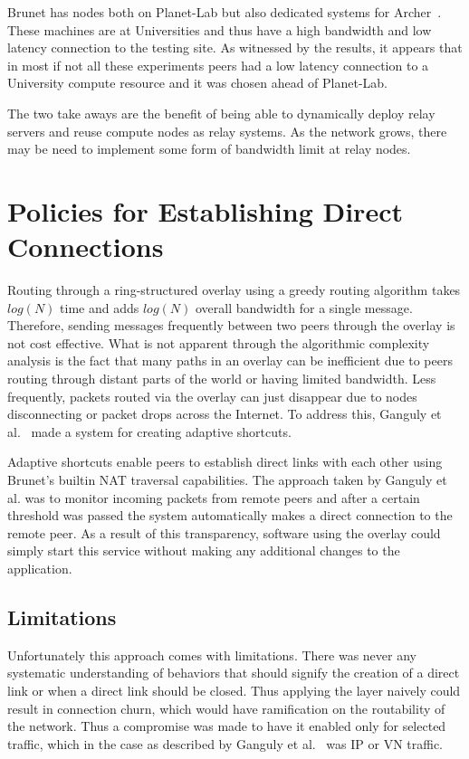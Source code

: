 Brunet has nodes both on Planet-Lab but also dedicated systems for
Archer~\cite{archer}.  These machines are at Universities and thus have a high
bandwidth and low latency connection to the testing site.  As witnessed by the
results, it appears that in most if not all these experiments peers had a low
latency connection to a University compute resource and it was chosen ahead of
Planet-Lab.

The two take aways are the benefit of being able to dynamically deploy relay
servers and reuse compute nodes as relay systems.  As the network grows, there
may be need to implement some form of bandwidth limit at relay nodes.

\section{Policies for Establishing Direct Connections}

Routing through a ring-structured overlay using a greedy routing algorithm
takes $log(N)$ time and adds $log(N)$ overall bandwidth for a single message.
Therefore, sending messages frequently between two peers through the overlay is
not cost effective.  What is not apparent through the algorithmic complexity
analysis is the fact that many paths in an overlay can be inefficient due to
peers routing through distant parts of the world or having limited bandwidth.
Less frequently, packets routed via the overlay can just disappear due to nodes
disconnecting or packet drops across the Internet.  To address this, Ganguly et
al.~\cite{wow} made a system for creating adaptive shortcuts.

Adaptive shortcuts enable peers to establish direct links with each other using
Brunet's builtin NAT traversal capabilities.  The approach taken by Ganguly et
al. was to monitor incoming packets from remote peers and after a certain
threshold was passed the system automatically makes a direct connection to the
remote peer.  As a result of this transparency, software using the overlay
could simply start this service without making any additional changes to the
application.  

\subsection{Limitations}

Unfortunately this approach comes with limitations.  There was never any
systematic understanding of behaviors that should signify the creation of a
direct link or when a direct link should be closed.  Thus applying the layer
naively could result in connection churn, which would have ramification on the
routability of the network.  Thus a compromise was made to have it enabled only
for selected traffic, which in the case as described by Ganguly et
al.~\cite{wow} was IP or VN traffic.


